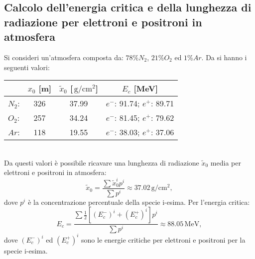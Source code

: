 \documentclass[10pt,a4paper,usenatbib]{article}
\newcommand*{\unit}[1]{\ensuremath{\mathrm{\,#1}}}                              %
\begin{document}
\subsection{Calcolo dell'energia critica e della lunghezza di radiazione per elettroni e positroni in atmosfera}
\label{appendix:a}
Si consideri un'atmosfera composta da: $78\% N_2$, $21\% O_2$ ed $1\% Ar$. Da \cite{Olive:2016xmw} si hanno i seguenti valori: 
\begin{table}[h!]
\centering
\begin{tabular}{lccc}
\toprule
                      &   $x_0$ [m]   &   $\tilde{x}_0$ [$\unit{g/cm^2}$]   &   $E_c$ [MeV]                  \\                          
\midrule
$N_2$:          &   326              &   37.99                               &  $e^-$: 91.74; $e^+$: 89.71        \\
$O_2$:          &   257              &   34.24                               &  $e^-$: 81.45; $e^+$: 79.62         \\
$Ar$:             &   118              &   19.55                               &  $e^-$: 38.03; $e^+$: 37.06          \\
\bottomrule
\end{tabular}
\end{table}
\\Da questi valori è possibile ricavare una lunghezza di radiazione $\tilde{x}_0$ media per elettroni e positroni in atmosfera: \\
\begin{equation*}
\tilde{x}_0 = \frac{\sum\tilde{x}_0^i p^i}{\sum p^i} \approx 37.02\unit{g/cm^2},
\end{equation*}
dove $p^i$ è la concentrazione percentuale della specie i-esima. Per l'energia critica:
\begin{equation*}
E_c = \frac{\sum \frac 1 2 {\left[\left(E_c^-\right)^i + \left(E_c^+\right)^i\right]} p^i}{\sum p^i} \approx 88.05\unit{MeV},
\end{equation*}
dove $\left(E_c^-\right)^i$ ed $\left(E_c^+\right)^i$ sono le energie critiche per elettroni e positroni per la specie i-esima.
\end{document}
